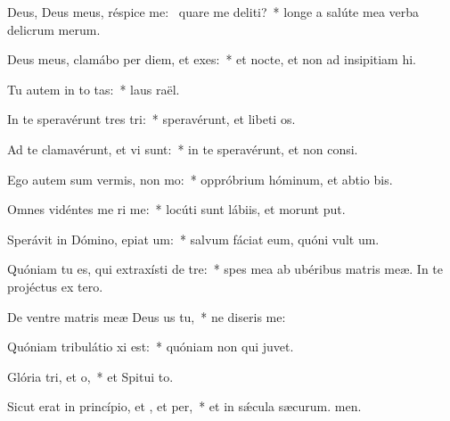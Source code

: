 \item Deus, Deus meus, réspice  me:~\pscross{} quare me deliti?~* longe a salúte mea verba delicrum merum.
\item Deus meus, clamábo per diem, et  exes:~* et nocte, et non ad insipitiam hi.
\item Tu autem in to tas:~* laus raël.
\item In te speravérunt tres tri:~* speravérunt, et libeti os.
\item Ad te clamavérunt, et vi  sunt:~* in te speravérunt, et non  consi.
\item Ego autem sum vermis,  non mo:~* oppróbrium hóminum, et abtio bis.
\item Omnes vidéntes me ri me:~* locúti sunt lábiis, et morunt put.
\item Sperávit in Dómino, epiat um:~* salvum fáciat eum, quóni vult um.
\item Quóniam tu es, qui extraxísti  de tre:~* spes mea ab ubéribus matris meæ. In te projéctus  ex tero.
\item De ventre matris meæ Deus us  tu,~* ne diseris  me:
\item Quóniam tribulátio xi est:~* quóniam non  qui juvet.
\item Glória tri, et o,~* et Spitui to.
\item Sicut erat in princípio, et , et per,~* et in sǽcula sæcurum. men.
